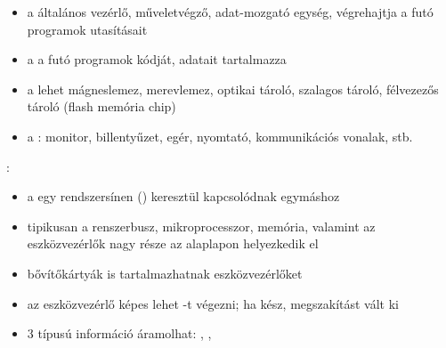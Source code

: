 \documentclass[main.tex]{subfiles}
\begin{document}
  \begin{minipage}[c]{0.25\textwidth}
    \begin{figure}[H]
      \centering
    \end{figure}
  \end{minipage}\hfill
  \begin{minipage}[c]{0.75\textwidth}
    \begin{itemize}
      \item a 
      általános vezérlő, műveletvégző, adat-mozgató egység,
      végrehajtja a futó programok utasításait

      \item a 
      a futó programok kódját, adatait tartalmazza

      \item a 
      lehet mágneslemez, merevlemez, optikai tároló,
      szalagos tároló, félvezezős tároló
      (flash memória chip)

      \item a :
      monitor, billentyűzet, egér,
      nyomtató, kommunikációs vonalak, stb.
    \end{itemize}
  \end{minipage}\hfill
  
  \pagebreak
  {\large {}:}
  \begin{itemize}
    \item a  egy rendszersínen
    () keresztül kapcsolódnak egymáshoz

    \item tipikusan a renszerbusz, mikroprocesszor,
    memória, valamint az eszközvezérlők nagy része
    az alaplapon helyezkedik el

    \item bővítőkártyák is tartalmazhatnak eszközvezérlőket
    
    \item az eszközvezérlő képes lehet -t végezni;
    ha kész, megszakítást vált ki

    \item 3 típusú információ áramolhat:
    , , 
  \end{itemize}
\end{document}
